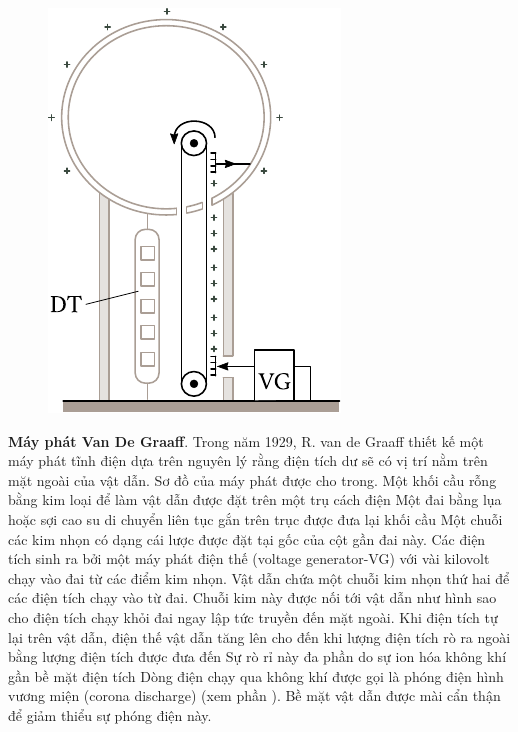\begin{figure}[t]
	\begin{center}
		\includegraphics[scale=1]{figures/ch_10/fig_10_14.pdf}
		\caption[]{}
		\label{fig:10_14}
	\end{center}
	\vspace{-0.8cm}
\end{figure}

\textbf{Máy phát Van De Graaff}. Trong năm 1929, R. van de Graaff thiết kế một máy phát tĩnh điện dựa trên nguyên lý rằng điện tích dư sẽ có vị trí nằm trên mặt ngoài của vật dẫn.
Sơ đồ của máy phát được cho trong.
Một khối cầu rỗng bằng kim loại để làm vật dẫn được đặt trên một trụ cách điện
Một đai bằng lụa hoặc sợi cao su di chuyển liên tục gắn trên trục được đưa lại khối cầu
Một chuỗi các kim nhọn có dạng cái lược được đặt tại gốc của cột gần đai này.
Các điện tích sinh ra bởi một máy phát điện thế (voltage generator-VG) với vài kilovolt chạy vào đai từ các điểm kim nhọn.
Vật dẫn chứa một chuỗi kim nhọn thứ hai để các điện tích chạy vào từ đai.
Chuỗi kim này được nối tới vật dẫn như hình  sao cho điện tích chạy khỏi đai ngay lập tức truyền đến mặt ngoài.
Khi điện tích tự lại trên vật dẫn, điện thế vật dẫn tăng lên cho đến khi lượng điện tích rò ra ngoài bằng lượng điện tích được đưa đến
Sự rò rỉ này đa phần do sự ion hóa không khí gần bề mặt điện tích
Dòng điện chạy qua không khí được gọi là phóng điện hình vương miện (corona discharge) (xem phần ).
Bề mặt vật dẫn được mài cẩn thận để giảm thiểu sự phóng điện này.


